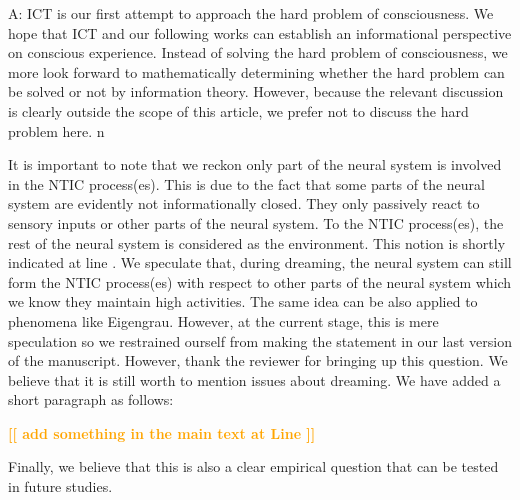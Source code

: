 \documentclass[utf8]{article}
\newenvironment{ans}  
    {\color{Black}\noindent A:}
    {~\newline}
\newcommand{\toWrite}[1]{\noindent
	\textcolor{Orange}{\textbf{[[ #1 ]]}}}
\begin{document}
    	\begin{ans}
    		ICT is our first attempt to approach the hard problem of consciousness. We hope that ICT and our following works can establish an informational perspective on conscious experience. Instead of solving the hard problem of consciousness, we more look forward to mathematically determining whether the hard problem can be solved or not by information theory. However, because the relevant discussion is clearly outside the scope of this article, we prefer not to discuss the hard problem here. n
    		
    		It is important to note that we reckon only part of the neural system is involved in the NTIC process(es). This is due to the fact that some parts of the neural system are evidently not informationally closed. They only passively react to sensory inputs or other parts of the neural system. 
    		To the NTIC process(es), the rest of the neural system is considered as the environment. This notion is shortly indicated at line .
    		We speculate that, during dreaming, the neural system can still form the NTIC process(es) with respect to other parts of the neural system which we know they maintain high activities. The same idea can be also applied to phenomena like Eigengrau. However, at the current stage, this is mere speculation so we restrained ourself from making the statement in our last version of the manuscript. However, thank the reviewer for bringing up this question. We believe that it is still worth to mention issues about dreaming. We have added a short paragraph as follows:
    		
    		\toWrite{add something in the main text at Line }
    		    
    		Finally, we believe that this is also a clear empirical question that can be tested in future studies. 
    	\end{ans}

	
\end{document}
